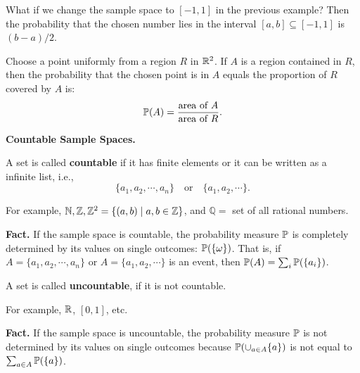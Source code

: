  \begin{example}
   What if we change the sample space to $[-1,1]$ in the previous example? Then
   the probability that the chosen number lies in the interval $[a,b]\subseteq
   [-1,1]$ is $(b-a)/2$.
 \end{example}
 \begin{example}
   Choose a point uniformly from a region $R$ in $\mathbb{R}^2$. If $A$ is a region
   contained in $R$, then the probability that the chosen point is in $A$ equals
   the proportion of $R$ covered by $A$ is:
   \[
     \mathbb{P}(A) = \frac{\text{area of}~A}{\text{area of}~R}.
   \]
 \end{example}

 \textbf{Countable Sample Spaces.}
 \begin{definition}
   A set is called \textbf{countable} if it has finite elements or it can be
   written as a infinite list, i.e.,
   \[
     \{a_1,a_2,\cdots, a_n\}\quad\text{or}\quad\{a_1,a_2,\cdots\}.
   \]
 \end{definition}
 For example, $\mathbb{N}, \mathbb{Z}, \mathbb{Z}^2 = \{(a,b)\mid a, b\in \mathbb{Z}\}$, and $\mathbb{Q}=$ set
 of all rational numbers.

 \textbf{Fact.} If the sample space is countable, the probability measure $\mathbb{P}$
 is completely determined by its values on single outcomes: $\mathbb{P}(\{\omega\})$.
 That is, if $A=\{a_1,a_2,\cdots, a_n\}$ or $A=\{a_1,a_2,\cdots\}$ is an event,
 then $\mathbb{P}(A) = \sum_i \mathbb{P}(\{a_i\})$.

 \begin{definition}
   A set is called \textbf{uncountable}, if it is not countable. 
 \end{definition}
 For example, $\mathbb{R}$, $[0,1]$, etc.

 \textbf{Fact.} If the sample space is uncountable, the probability measure
 $\mathbb{P}$ is not determined by its values on single outcomes because
 $\mathbb{P}(\cup_{a\in A} \{a\})$ is not equal to $\sum_{a\in A} \mathbb{P}(\{a\})$.

 
